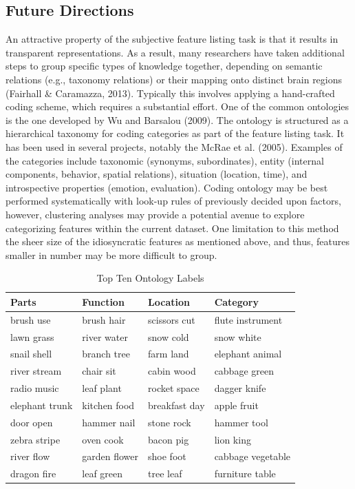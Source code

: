 \documentclass[man]{apa6}
\begin{document}
\hypertarget{future-directions}{%
\subsection{Future Directions}\label{future-directions}}

An attractive property of the subjective feature listing task is that it results in transparent representations. As a result, many researchers have taken additional steps to group specific types of knowledge together, depending on semantic relations (e.g., taxonomy relations) or their mapping onto distinct brain regions (Fairhall \& Caramazza, 2013). Typically this involves applying a hand-crafted coding scheme, which requires a substantial effort. One of the common ontologies is the one developed by Wu and Barsalou (2009). The ontology is structured as a hierarchical taxonomy for coding categories as part of the feature listing task. It has been used in several projects, notably the McRae et al. (2005). Examples of the categories include taxonomic (synonyms, subordinates), entity (internal components, behavior, spatial relations), situation (location, time), and introspective properties (emotion, evaluation). Coding ontology may be best performed systematically with look-up rules of previously decided upon factors, however, clustering analyses may provide a potential avenue to explore categorizing features within the current dataset. One limitation to this method the sheer size of the idiosyncratic features as mentioned above, and thus, features smaller in number may be more difficult to group.

\begin{table}[t]

\caption{\label{tab:tab8}Top Ten Ontology Labels}
\centering
\begin{tabular}{llll}
\toprule
Parts & Function & Location & Category\\
\midrule
brush use & brush hair & scissors cut & flute instrument\\
lawn grass & river water & snow cold & snow white\\
snail shell & branch tree & farm land & elephant animal\\
river stream & chair sit & cabin wood & cabbage green\\
radio music & leaf plant & rocket space & dagger knife\\
\addlinespace
elephant trunk & kitchen food & breakfast day & apple fruit\\
door open & hammer nail & stone rock & hammer tool\\
zebra stripe & oven cook & bacon pig & lion king\\
river flow & garden flower & shoe foot & cabbage vegetable\\
dragon fire & leaf green & tree leaf & furniture table\\
\bottomrule
\end{tabular}
\end{table}
\end{document}
